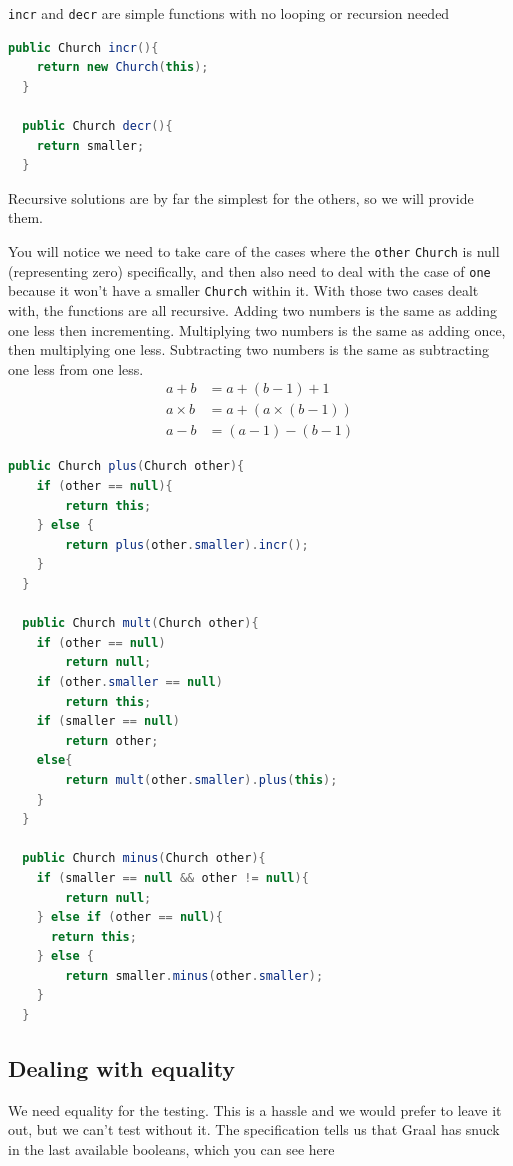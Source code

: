 \documentclass[twoside=false,DIV=14]{scrartcl}
\begin{document}
\lstinline{incr} and \lstinline{decr} are simple functions with no looping or recursion needed
\begin{lstlisting}[language=java]
  public Church incr(){
    return new Church(this);
  }

  public Church decr(){
    return smaller;
  }
\end{lstlisting}

Recursive solutions are by far the simplest for the others, so we will provide them.

You will notice we need to take care of the cases where the \lstinline{other} \lstinline{Church} is null (representing zero) specifically, and then also need to deal with the case of \lstinline{one} because it won't have a smaller \lstinline{Church} within it.  With those two cases dealt with, the functions are all recursive.  Adding two numbers is the same as adding one less then incrementing.  Multiplying two numbers is the same as adding once, then multiplying one less.  Subtracting two numbers is the same as subtracting one less from one less.
\begin{align*}
  a + b & = a + (b - 1) + 1 \\
  a \times b & = a + (a \times (b - 1)) \\
  a - b & = (a - 1) - (b - 1)
\end{align*}


\begin{lstlisting}[language=java]
  public Church plus(Church other){
    if (other == null){
        return this;
    } else {
        return plus(other.smaller).incr();
    }
  }

  public Church mult(Church other){
    if (other == null)
        return null;
    if (other.smaller == null)
        return this;
    if (smaller == null)
        return other;
    else{
        return mult(other.smaller).plus(this);
    }
  }

  public Church minus(Church other){
    if (smaller == null && other != null){
        return null;
    } else if (other == null){
      return this;
    } else {
        return smaller.minus(other.smaller);
    }
  }
\end{lstlisting}

\subsection{Dealing with equality}
We need equality for the testing.  This is a hassle and we would prefer to leave it out, but we can't test without it.  The specification tells us that Graal has snuck in the last available booleans, which you can see here
\end{document}
